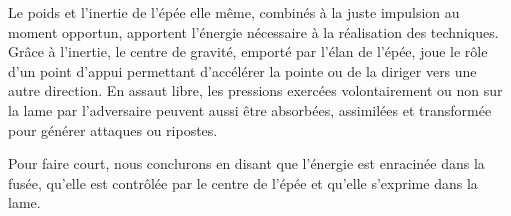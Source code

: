 Le poids et l'inertie de l'épée elle même, combinés à la juste impulsion au moment opportun, apportent l'énergie nécessaire à la réalisation des techniques.
Grâce à l'inertie, le centre de gravité, emporté par l'élan de l'épée, joue le rôle d'un point d'appui permettant d'accélérer la pointe ou de la diriger vers une autre direction.
En assaut libre, les pressions exercées volontairement ou non sur la lame par l'adversaire peuvent aussi être absorbées, assimilées et transformée pour générer attaques ou ripostes.

Pour faire court, nous conclurons en disant que l'énergie est enracinée dans la fusée, qu'elle est contrôlée par le centre de l'épée et qu'elle s'exprime dans la lame.